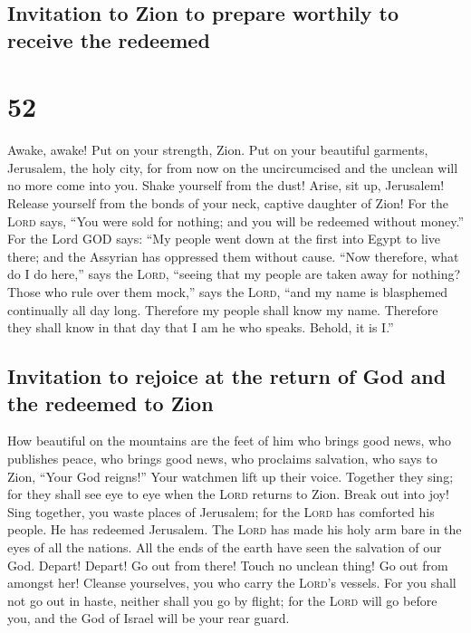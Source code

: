 \hypertarget{invitation-to-zion-to-prepare-worthily-to-receive-the-redeemed}{%
\subsection{Invitation to Zion to prepare worthily to receive the
redeemed}\label{invitation-to-zion-to-prepare-worthily-to-receive-the-redeemed}}

\hypertarget{section-51}{%
\section{52}\label{section-51}}

 Awake, awake! Put on your strength, Zion. Put on your
beautiful garments, Jerusalem, the holy city, for from now on the
uncircumcised and the unclean will no more come into you. 
Shake yourself from the dust! Arise, sit up, Jerusalem! Release yourself
from the bonds of your neck, captive daughter of Zion! 
For the \textsc{Lord} says, ``You were sold for nothing; and you will be
redeemed without money.''  For the Lord GOD says: ``My
people went down at the first into Egypt to live there; and the Assyrian
has oppressed them without cause.  ``Now therefore, what
do I do here,'' says the \textsc{Lord}, ``seeing that my people are
taken away for nothing? Those who rule over them mock,'' says the
\textsc{Lord}, ``and my name is blasphemed continually all day long.
 Therefore my people shall know my name. Therefore they
shall know in that day that I am he who speaks. Behold, it is I.''

\hypertarget{invitation-to-rejoice-at-the-return-of-god-and-the-redeemed-to-zion}{%
\subsection{Invitation to rejoice at the return of God and the redeemed
to
Zion}\label{invitation-to-rejoice-at-the-return-of-god-and-the-redeemed-to-zion}}

 How beautiful on the mountains are the feet of him who
brings good news, who publishes peace, who brings good news, who
proclaims salvation, who says to Zion, ``Your God reigns!''
 Your watchmen lift up their voice. Together they sing;
for they shall see eye to eye when the \textsc{Lord} returns to Zion.
 Break out into joy! Sing together, you waste places of
Jerusalem; for the \textsc{Lord} has comforted his people. He has
redeemed Jerusalem.  The \textsc{Lord} has made his holy
arm bare in the eyes of all the nations. All the ends of the earth have
seen the salvation of our God.  Depart! Depart! Go out
from there! Touch no unclean thing! Go out from amongst her! Cleanse
yourselves, you who carry the \textsc{Lord}'s vessels. 
For you shall not go out in haste, neither shall you go by flight; for
the \textsc{Lord} will go before you, and the God of Israel will be your
rear guard.

